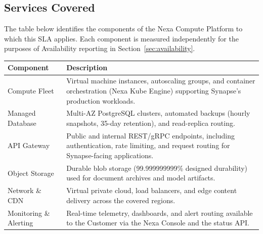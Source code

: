 \subsection{Services Covered}

The table below identifies the components of the Nexa Compute Platform to which this SLA
applies. Each component is measured independently for the purposes of Availability
reporting in Section~\ref{sec:availability}.

\vspace{6pt}
\begin{tabularx}{\linewidth}{@{} L{3.6cm} X @{}}
  \toprule
  \textbf{Component} & \textbf{Description} \\
  \midrule
  Compute Fleet &
    Virtual machine instances, autoscaling groups, and container orchestration
    (Nexa Kube Engine) supporting Synapse's production workloads. \\
  Managed Database &
    Multi-AZ PostgreSQL clusters, automated backups (hourly snapshots, 35-day retention),
    and read-replica routing. \\
  API Gateway &
    Public and internal REST/gRPC endpoints, including authentication, rate limiting,
    and request routing for Synapse-facing applications. \\
  Object Storage &
    Durable blob storage (99.999999999\% designed durability) used for document archives
    and model artifacts. \\
  Network \& CDN &
    Virtual private cloud, load balancers, and edge content delivery across the covered
    regions. \\
  Monitoring \& Alerting &
    Real-time telemetry, dashboards, and alert routing available to the Customer via the
    Nexa Console and the status API. \\
  \bottomrule
\end{tabularx}
\label{tab:services}
